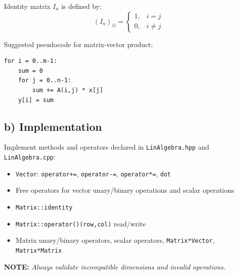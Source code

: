 \documentclass[11pt,a4paper]{article}
\begin{document}
Identity matrix $I_n$ is defined by:
$$
(I_n)_{ij}=
\begin{cases}
1, & i=j \\
0, & i\neq j
\end{cases}
$$

Suggested pseudocode for matrix-vector product:
\begin{verbatim}
for i = 0..m-1:
    sum = 0
    for j = 0..n-1:
        sum += A(i,j) * x[j]
    y[i] = sum
\end{verbatim}

\subsection*{b) Implementation}
Implement methods and operators declared in \texttt{LinAlgebra.hpp} and \texttt{LinAlgebra.cpp}:
\begin{itemize}[leftmargin=*]
    \item \texttt{Vector}: \texttt{operator+=}, \texttt{operator-=}, \texttt{operator*=}, \texttt{dot}
    \item Free operators for vector unary/binary operations and scalar operations
    \item \texttt{Matrix::identity}
    \item \texttt{Matrix::operator()(row,col)} read/write
    \item Matrix unary/binary operators, scalar operators, \texttt{Matrix*Vector}, \texttt{Matrix*Matrix}
\end{itemize}
\par

\textbf{NOTE:} \textit{Always validate incompatible dimensions and invalid operations.}
\end{document}
